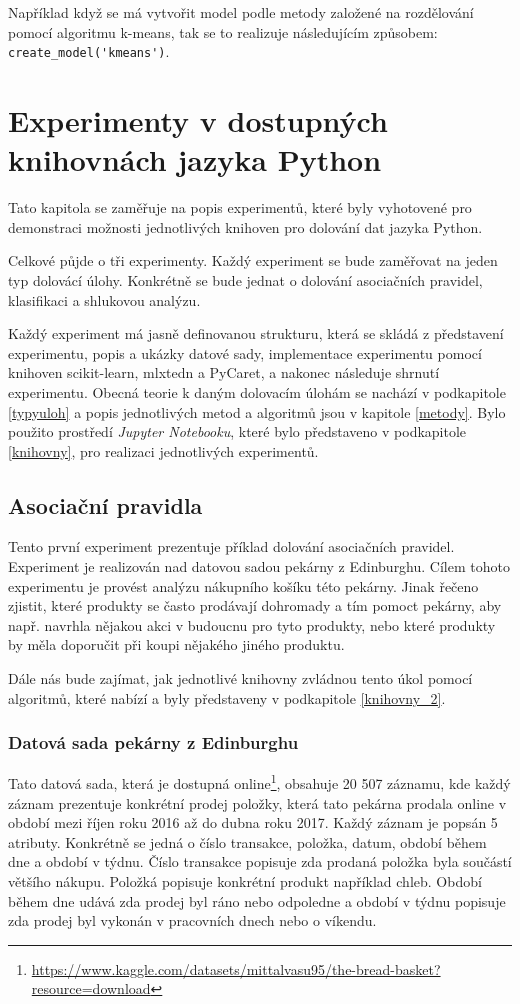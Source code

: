 Například když se má vytvořit model podle metody založené na rozdělování pomocí algoritmu k-means, tak se to realizuje následujícím způsobem: \verb|create_model('kmeans')|.

\chapter{Experimenty v dostupných knihovnách jazyka Python}
\label{experimenty}
Tato kapitola se zaměřuje na popis experimentů, které byly vyhotovené pro demonstraci možnosti jednotlivých knihoven pro dolování dat jazyka Python. 

Celkové půjde o tři experimenty. Každý experiment se bude zaměřovat na jeden typ dolovácí úlohy. Konkrétně se bude jednat o dolování asociačních pravidel, klasifikaci a shlukovou analýzu.

Každý experiment má jasně definovanou strukturu, která se skládá z představení experimentu, popis a ukázky datové sady, implementace experimentu pomocí knihoven scikit-learn, mlxtedn a PyCaret, a nakonec následuje shrnutí experimentu. Obecná teorie k daným dolovacím úlohám se nachází v podkapitole \ref{typyuloh} a popis jednotlivých metod a algoritmů jsou v kapitole \ref{metody}. Bylo použito prostředí \textit{Jupyter Notebooku}, které bylo představeno v podkapitole \ref{knihovny}, pro realizaci jednotlivých experimentů. 

\section{Asociační pravidla}
\label{asociacni-pravidla}
Tento první experiment prezentuje příklad dolování asociačních pravidel. Experiment je realizován nad datovou sadou pekárny z Edinburghu. Cílem tohoto experimentu je provést analýzu nákupního košíku této pekárny.  Jinak řečeno zjistit, které produkty se často prodávají dohromady a tím pomoct pekárny, aby např. navrhla nějakou akci v budoucnu pro tyto produkty, nebo které produkty by měla doporučit při koupi nějakého jiného produktu. 

Dále nás bude zajímat, jak jednotlivé knihovny zvládnou tento úkol pomocí algoritmů, které nabízí a byly představeny v podkapitole \ref{knihovny_2}.

\subsection*{Datová sada pekárny z Edinburghu}
Tato datová sada, která je dostupná online\footnote{\url{https://www.kaggle.com/datasets/mittalvasu95/the-bread-basket?resource=download}}, obsahuje 20 507 záznamu, kde každý záznam prezentuje konkrétní prodej položky, která tato pekárna prodala online v období mezi říjen roku 2016 až  do dubna roku 2017. Každý záznam je popsán 5 atributy. Konkrétně se jedná o číslo transakce, položka, datum, období během dne a období v týdnu. Číslo transakce popisuje zda prodaná položka byla součástí většího nákupu. Položká popisuje konkrétní produkt například chleb. Období během dne udává zda prodej byl ráno nebo odpoledne a období v týdnu popisuje zda prodej byl vykonán v pracovních dnech nebo o víkendu.

